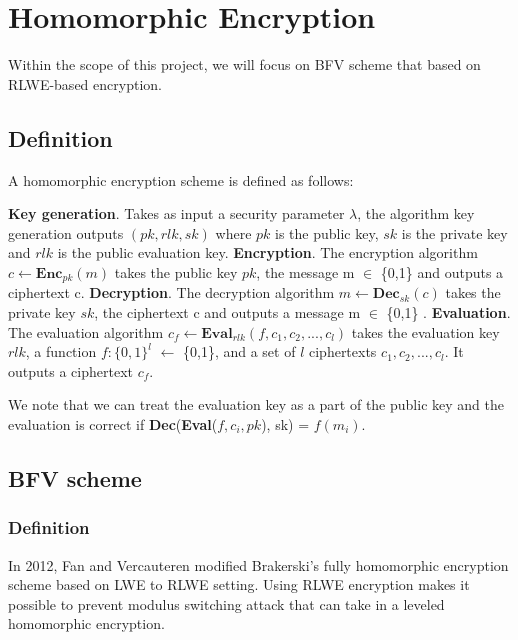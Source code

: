 \documentclass[A4paper,12pt]{article}
\begin{document}
\section{Homomorphic Encryption}
Within the scope of this project, we will focus on BFV scheme that based on RLWE-based encryption.
\subsection{Definition}
\begin{definition} A homomorphic encryption scheme is defined as follows:
\end{definition}
	\textbf{Key generation}. Takes as input a security parameter $\lambda$, the algorithm key generation outputs $(pk, rlk, sk) $ where $pk$ is the public key, $sk$ is the private key and $rlk$ is the public evaluation key. \newline
	\textbf{Encryption}. The encryption algorithm $c \leftarrow \textbf{Enc}_{pk}{(m)}$ takes the public key $pk$, the message m $\in$ \{0,1\} and outputs a ciphertext c. \newline
	\textbf{Decryption}. The decryption algorithm $m \leftarrow \textbf{Dec}_{sk}(c)$ takes the private key $sk$, the ciphertext c and outputs a message m $\in$ \{0,1\} . \newline
	\textbf{Evaluation}. The evaluation algorithm $c_f \leftarrow \textbf{Eval}_{rlk}(f, c_1, c_2,..., c_l) $ takes the evaluation key $rlk$, a function $f: \{0,1\}^l$ $\leftarrow$ \{0,1\}, and a set of $l$ ciphertexts $c_1, c_2,..., c_l$. It outputs a ciphertext $c_f$. \newline
	
We note that we can treat the evaluation key as a part of the public key and the evaluation is correct if \textbf{Dec}(\textbf{Eval}($f, c_i, pk$), sk) = $f(m_i)$.





\subsection{BFV scheme}
	\subsubsection{Definition}
In 2012, Fan and Vercauteren \cite{SHE} modified Brakerski's \cite{brakerskiFHE} fully homomorphic encryption scheme based on LWE to RLWE setting. Using RLWE encryption makes it possible to prevent modulus switching attack that can take in a leveled homomorphic encryption.
\end{document}
